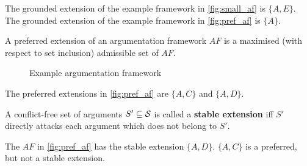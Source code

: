 \begin{exa}
	The grounded extension of the example framework in \autoref{fig:small_af} is $\{A, E\}$.
	The grounded extension of the example framework in \autoref{fig:pref_af} is $\{A\}$.
\end{exa}


\begin{definition}
A preferred extension of an argumentation framework $AF$ is a maximised (with respect to set inclusion) admissible set of $AF$.
\end{definition}

\begin{figure}[t]
\centering
{}
\caption{Example argumentation framework}
\label{fig:pref_af}
\end{figure}

\begin{exa}
The preferred extensions in \autoref{fig:pref_af} are $\{A, C\}$ and $\{A, D\}$.
\end{exa}

\begin{definition}
A conflict-free set of arguments $S' \subseteq \S$ is called a \textbf{stable extension} iff $S'$ directly attacks each argument which does not belong to $S'$.
\end{definition}
\begin{exa}
The $AF$ in \autoref{fig:pref_af} has the stable extension $\{A, D\}$. $\{A, C\}$ is a preferred, but not a stable extension.
\end{exa}


